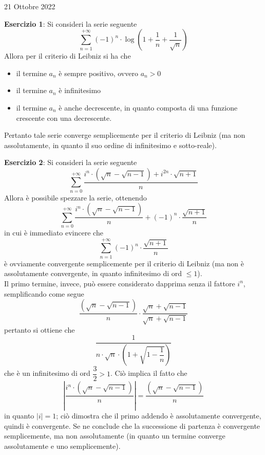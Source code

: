 \documentclass[a4paper]{extarticle}
\begin{document}
\newpage
\noindent
\begin{center}
    21 Ottobre 2022
\end{center}

\vspace{1em}
\noindent
\textbf{Esercizio 1}: Si consideri la serie seguente
\[\sum_{n=1}^{+\infty} (-1)^n \cdot \log \left(1+\frac{1}{n}+\frac{1}{\sqrt{n}}\right)\]
Allora per il criterio di Leibniz si ha che
\begin{itemize}
    \item il termine $a_n$ è sempre positivo, ovvero $a_n>0$
    \item il termine $a_n$ è infinitesimo
    \item il termine $a_n$ è anche decrescente, in quanto composta di una funzione crescente con una decrescente.
\end{itemize}
Pertanto tale serie converge semplicemente per il criterio di Leibniz (ma non assolutamente, in quanto il suo ordine di infinitesimo e sotto-reale).

\vspace{1em}
\noindent
\textbf{Esercizio 2}: Si consideri la serie seguente
\[\sum_{n=0}^{+\infty} \frac{i^n \cdot \left(\sqrt{n} - \sqrt{n-1}\right) + i^{2n} \cdot \sqrt{n+1}}{n}\]
Allora è possibile spezzare la serie, ottenendo
\[\sum_{n=0}^{+\infty} \frac{i^n \cdot \left(\sqrt{n} - \sqrt{n-1}\right)}{n} + (-1)^n \cdot \frac{\sqrt{n+1}}{n}\]
in cui è immediato evincere che
\[\sum_{n=1}^{+\infty} (-1)^n \cdot \frac{\sqrt{n+1}}{n}\]
è ovviamente convergente semplicemente per il criterio di Leibniz (ma non è assolutamente convergente, in quanto infinitesimo di ord $\leq 1$).\\
Il primo termine, invece, può essere considerato dapprima senza il fattore $i^n$, semplificando come segue 
\[\frac{\left(\sqrt{n} - \sqrt{n-1}\right)}{n} \cdot \frac{\sqrt{n} + \sqrt{n-1}}{\sqrt{n} + \sqrt{n-1}}\]
pertanto si ottiene che
\[\dfrac{1}{n \cdot \sqrt{n} \cdot \left(1+\sqrt{1-\dfrac{1}{n}} \right)}\]
che è un infinitesimo di ord $\dfrac{3}{2}>1$. Ciò implica il fatto che
\[\left \vert \frac{i^n \cdot \left(\sqrt{n} - \sqrt{n-1}\right)}{n} \right \vert =  \frac{\left(\sqrt{n} - \sqrt{n-1}\right)}{n}\]
in quanto $\vert i \vert = 1$; ciò dimostra che il primo addendo è assolutamente convergente, quindi è convergente. Se ne conclude che la successione di partenza è convergente semplicemente, ma non assolutamente (in quanto un termine converge assolutamente e uno semplicemente).
\end{document}
